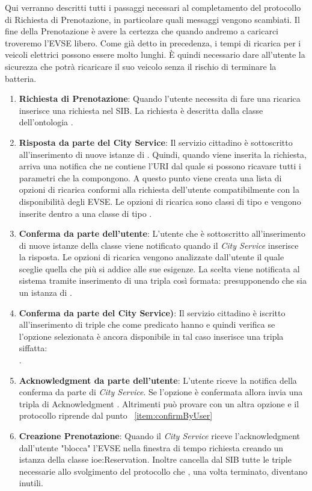 Qui verranno descritti tutti i passaggi necessari al completamento del protocollo di Richiesta di Prenotazione, in particolare quali messaggi vengono scambiati. Il fine della Prenotazione è avere la certezza che quando andremo a caricarci troveremo l'EVSE libero. Come già detto in precedenza, i tempi di ricarica per i veicoli elettrici possono essere molto lunghi. È quindi necessario dare all'utente la sicurezza che potrà ricaricare il suo veicolo senza il rischio di terminare la batteria.

\begin{enumerate}[label=\textbf{\arabic*}]
	\item \textbf{Richiesta di Prenotazione}: Quando l'utente necessita di fare una ricarica inserisce una richiesta nel SIB. La richiesta è descritta dalla classe dell'ontologia .
	\item \textbf{Risposta da parte del City Service}: Il servizio cittadino è sottoscritto all'inserimento di nuove istanze di . Quindi, quando viene inserita la richiesta, arriva una notifica che ne contiene l'URI dal quale si possono ricavare tutti i parametri che la compongono. A questo punto viene creata una lista di opzioni di ricarica conformi alla richiesta dell'utente compatibilmente con la disponibilità degli EVSE. Le opzioni di ricarica sono classi di tipo  e vengono inserite dentro a una classe di tipo .
	\item \label{item:confirmByUser} \textbf{Conferma da parte dell'utente}: L'utente che è sottoscritto all'inserimento di nuove istanze della classe   viene notificato quando il \emph{City Service} inserisce la risposta. Le opzioni di ricarica vengono analizzate dall'utente il quale sceglie quella che più si addice alle sue esigenze. La scelta viene notificata al sistema tramite inserimento di una tripla così formata:  presupponendo che  sia un istanza di .
	\item \textbf{Conferma da parte del City Service)}: Il servizio cittadino è iscritto all'inserimento di triple che come predicato hanno  e quindi verifica se l'opzione selezionata è ancora disponibile in tal caso inserisce una tripla siffatta:
	\\ . 
	\item \textbf{Acknowledgment da parte dell'utente}: L'utente riceve la notifica della conferma da parte di \emph{City Service}. Se l'opzione è confermata allora invia una tripla di Acknowledgment . Altrimenti può provare con un altra opzione e il protocollo riprende dal punto ~\ref{item:confirmByUser}
	\item \textbf{Creazione Prenotazione}: Quando il \emph{City Service} riceve l'acknowledgment dall'utente "blocca" l'EVSE nella finestra di tempo richiesta creando un istanza della classe {ioe:Reservation}. Inoltre cancella dal SIB tutte le triple necessarie allo svolgimento del protocollo che  , una volta terminato, diventano inutili.
\end{enumerate}

